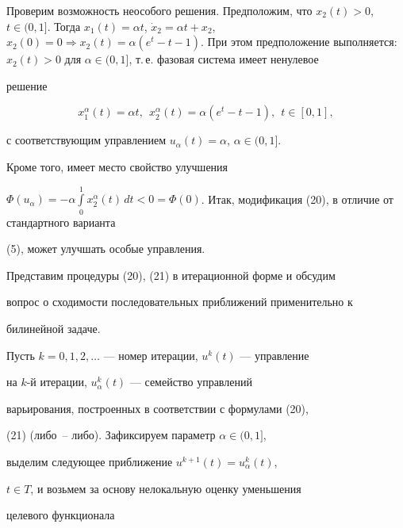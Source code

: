 Проверим возможность неособого решения. Предположим, что $x_{2}(t)


> 0$, $t \in (0, 1]$. Тогда $x_{1}(t) = \alpha t$, $\Dot{x}_{2} =


\alpha t + x_{2}$, $x_{2}(0) = 0 \Rightarrow x_{2}(t) = \alpha


(e^{t} - t -1)$. При этом предположение выполняется: $x_{2}(t) >


0$ для $\alpha \in (0, 1]$, т.\,е. фазовая система имеет ненулевое


решение


$$


x_{1}^{\alpha}(t) = \alpha t,


\ \ x_{2}^{\alpha}(t) = \alpha(e^{t} - t - 1),\ \ t \in [0, 1],


$$


с соответствующим управлением $ u_{\alpha}(t) = \alpha$, $\alpha


\in (0, 1]$.





Кроме того, имеет место свойство улучшения


$\Phi(u_{\alpha})=-\alpha \int\limits_{0}^{1} x_{2}^{\alpha}(t)\,dt < 0 =


\Phi(0)$. Итак, модификация (20), в отличие от стандартного варианта


(5), может улучшать особые управления.





Представим процедуры (20), (21) в итерационной форме и обсудим


вопрос о сходимости последовательных приближений применительно к


билинейной задаче.





Пусть $k = 0, 1, 2,\dotsc$ --- номер итерации, $u^{k}(t)$ --- управление


на $k$-й итерации, $u_{\alpha}^{k}(t)$ --- семейство управлений


варьирования, построенных в соответствии с формулами (20),


(21) (либо~-- либо). Зафиксируем параметр $\alpha \in (0, 1]$,


выделим следующее приближение $u^{k + 1}(t) = u_{\alpha}^{k}(t)$,


$t \in T$, и возьмем за основу нелокальную оценку уменьшения


целевого функционала


